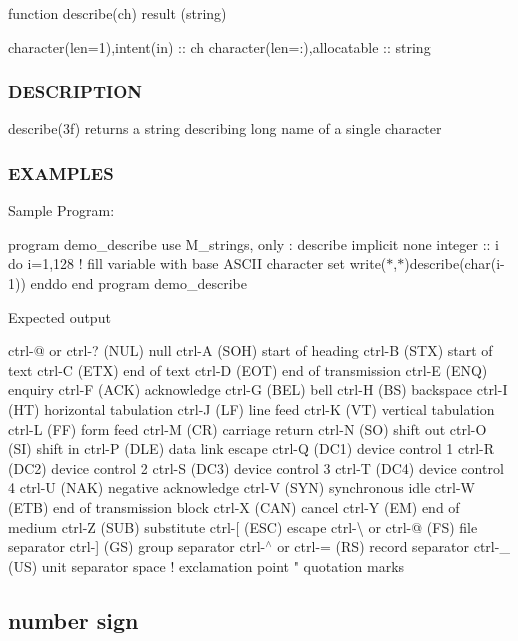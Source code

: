\begin{DoxyVerb}function describe(ch) result (string)

 character(len=1),intent(in)   :: ch
 character(len=:),allocatable  :: string
\end{DoxyVerb}


\subsubsection*{D\+E\+S\+C\+R\+I\+P\+T\+I\+ON}

describe(3f) returns a string describing long name of a single character

\subsubsection*{E\+X\+A\+M\+P\+L\+ES}

Sample Program\+:

program demo\+\_\+describe use M\+\_\+strings, only \+: describe implicit none integer \+:\+: i do i=1,128 ! fill variable with base A\+S\+C\+II character set write($\ast$,$\ast$)describe(char(i-\/1)) enddo end program demo\+\_\+describe

Expected output

ctrl-\/@ or ctrl-\/? (N\+UL) null ctrl-\/A (S\+OH) start of heading ctrl-\/B (S\+TX) start of text ctrl-\/C (E\+TX) end of text ctrl-\/D (E\+OT) end of transmission ctrl-\/E (E\+NQ) enquiry ctrl-\/F (A\+CK) acknowledge ctrl-\/G (B\+EL) bell ctrl-\/H (BS) backspace ctrl-\/I (HT) horizontal tabulation ctrl-\/J (LF) line feed ctrl-\/K (VT) vertical tabulation ctrl-\/L (FF) form feed ctrl-\/M (CR) carriage return ctrl-\/N (SO) shift out ctrl-\/O (SI) shift in ctrl-\/P (D\+LE) data link escape ctrl-\/Q (D\+C1) device control 1 ctrl-\/R (D\+C2) device control 2 ctrl-\/S (D\+C3) device control 3 ctrl-\/T (D\+C4) device control 4 ctrl-\/U (N\+AK) negative acknowledge ctrl-\/V (S\+YN) synchronous idle ctrl-\/W (E\+TB) end of transmission block ctrl-\/X (C\+AN) cancel ctrl-\/Y (EM) end of medium ctrl-\/Z (S\+UB) substitute ctrl-\/\mbox{[} (E\+SC) escape ctrl-\/\textbackslash{} or ctrl-\/@ (FS) file separator ctrl-\/\mbox{]} (GS) group separator ctrl-\/$^\wedge$ or ctrl-\/= (RS) record separator ctrl-\/\+\_\+ (US) unit separator space ! exclamation point " quotation marks \subsection*{number sign}

